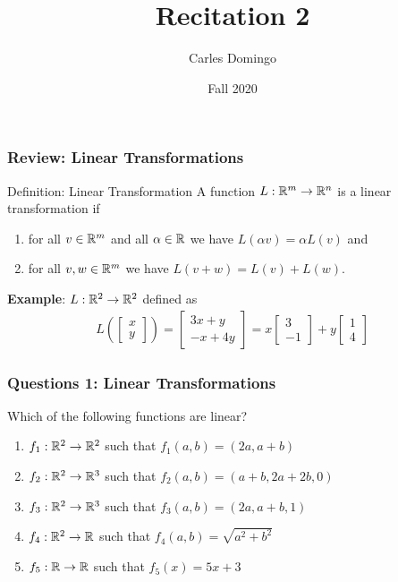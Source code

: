 \documentclass{beamer}
\title{Recitation 2}
\author{Carles Domingo}
\date{Fall 2020}
\begin{document}
\frame{\titlepage} 

\setcounter{showProgressBar}{0}
\setcounter{showSlideNumbers}{1}

\begin{frame}[t]
	\frametitle{Review: Linear Transformations}
	\begin{block}{Definition: Linear Transformation}
		A function $L: \mathbb{R}^m \to \mathbb{R}^n$ is a linear transformation if
	\begin{enumerate}
		\item for all $v \in \mathbb{R}^m$ and all $\alpha \in \mathbb{R}$ we have $L(\alpha v) = \alpha L(v)$ and
		\item for all $v,w \in \mathbb{R}^m$ we have $L(v + w) = L(v) + L(w)$.
	\end{enumerate}
	\end{block}
	\textbf{Example}: $L : \mathbb{R}^2 \to \mathbb{R}^2$ defined as 
	\begin{align*}	
	L\left( \begin{bmatrix} x \\ y \end{bmatrix} \right) = \begin{bmatrix} 3x+y \\ -x+4y \end{bmatrix} = x \begin{bmatrix} 3 \\ -1 \end{bmatrix} + y \begin{bmatrix} 1 \\ 4 \end{bmatrix}
	\end{align*}
\end{frame}

\begin{frame}[t]
\frametitle{Questions 1: Linear Transformations}
Which of the following functions are linear?  %
  \begin{enumerate}
  \item $f_1:\mathbb{R}^2\to\mathbb{R}^2$ such that $f_1(a,b) = (2a,a+b)$
  \item $f_2:\mathbb{R}^2\to\mathbb{R}^3$ such that $f_2(a,b) = (a+b,2a+2b,0)$
  \item $f_3:\mathbb{R}^2\to\mathbb{R}^3$ such that $f_3(a,b) = (2a,a+b,1)$
  \item $f_4:\mathbb{R}^2\to\mathbb{R}$ such that $f_4(a,b) = \sqrt{a^2+b^2}$
  \item $f_5:\mathbb{R}\to\mathbb{R}$ such that $f_5(x) = 5x+3$
  \end{enumerate}
\end{frame}
\end{document}
